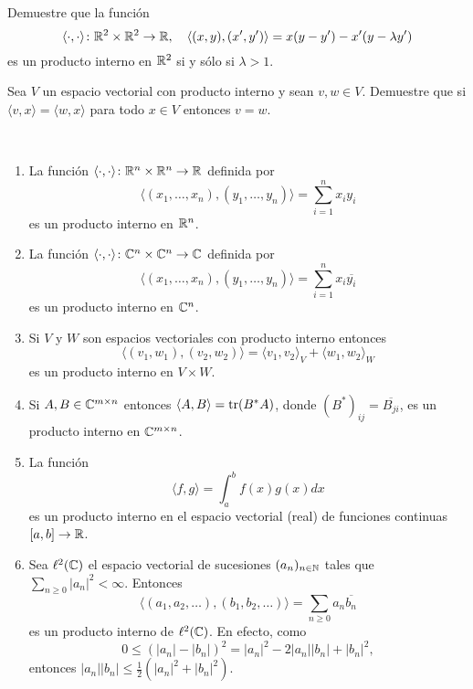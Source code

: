 \begin{xca}
    Demuestre que la función
    \[
    \langle\cdot,\cdot\rangle\colon\mathbb{R}^2\times\mathbb{R}^2\to\mathbb{R},\quad
        \langle (x,y),(x',y')\rangle=x(y-y')-x'(y-\lambda y')
    \]
    es un producto interno en $\mathbb{R}^2$ si y sólo si $\lambda>1$. 
\end{xca}

\begin{xca}
	\label{xca:<v-w,x>=0}
    Sea $V$ un espacio vectorial con producto interno y sean $v,w\in V$.
    Demuestre que si $\langle v,x\rangle=\langle w,x\rangle$ para todo $x\in V$
    entonces $v=w$. 
\end{xca}

\begin{examples}\
    \begin{enumerate}
        \item La función
            $\langle\cdot,\cdot\rangle\colon\mathbb{R}^n\times\mathbb{R}^n\to\mathbb{R}$ definida por
            \[
                \langle(x_1,\dots,x_n),(y_1,\dots,y_n)\rangle=\sum_{i=1}^n x_iy_i
            \]
            es un producto interno en $\mathbb{R}^n$. 
        \item La función
            $\langle\cdot,\cdot\rangle\colon\mathbb{C}^n\times\mathbb{C}^n\to\mathbb{C}$ definida por
            \[
            \langle(x_1,\dots,x_n),(y_1,\dots,y_n)\rangle=\sum_{i=1}^n x_i\overline{y_i}
            \]
            es un producto interno en $\mathbb{C}^n$. 
        \item Si $V$ y $W$ son espacios vectoriales con producto interno
            entonces
            \[
                \langle (v_1,w_1),(v_2,w_2)\rangle=\langle v_1,v_2\rangle_V+\langle w_1,w_2\rangle_W
            \]
            es un producto interno en $V\times W$.
        \item Si $A,B\in\mathbb{C}^{m\times n}$ entonces $\langle
            A,B\rangle=\operatorname{tr}(B^*A)$, donde $(B^*)_{ij}=\overline{B_{ji}}$, es un
            producto interno en $\mathbb{C}^{m\times n}$. 
        \item La función
            \[
                \langle f,g\rangle=\int_{a}^{b}f(x)g(x)dx
            \]  
            es un producto interno en el espacio vectorial (real) de funciones
            continuas $[a,b]\to\mathbb{R}$. 
        \item Sea $\ell^2(\mathbb{C})$ el espacio vectorial de sucesiones $(a_n)_{n\in\mathbb{N}}$ tales que
            $\sum_{n\geq0}|a_n|^2<\infty$. Entonces
            \[
                \langle (a_1,a_2,\dots),(b_1,b_2,\dots)\rangle =\sum_{n\geq0}a_n\overline{b_n}
            \]
            es un producto interno de $\ell^2(\mathbb{C})$. En efecto, como 
            \[
            0\leq(|a_n|-|b_n|)^2=|a_n|^2-2|a_n||b_n|+|b_n|^2,
            \]
            entonces $|a_n||b_n|\leq\frac12(|a_n|^2+|b_n|^2)$.
    \end{enumerate}
\end{examples}

